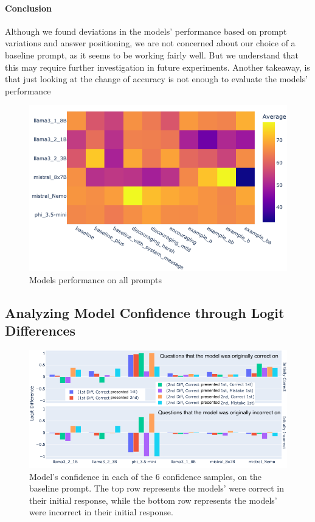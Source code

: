 \paragraph{Conclusion}

Although we found deviations in the models' performance based on prompt variations and answer positioning, we are not concerned about our choice of a baseline prompt, as it seems to be working fairly well. But we understand that this may require further investigation in future experiments.
Another takeaway, is that just looking at the change of accuracy is not enough to evaluate the models' performance

\begin{figure}[ht!]
  \includegraphics[width=\columnwidth]{img/model_performence_on_prompts.png}
  \caption{Models performance on all prompts}
  \label{rep: Models average heatmap}
\end{figure}

\subsection{Analyzing Model Confidence through Logit Differences}

\begin{figure}[htbp!]
  \centering
  \includegraphics[width=\textwidth]{img/model_confidence_by_initial_correctness_on_baseline.png}
  \caption{Model's confidence in each of the 6 confidence samples, on the baseline prompt. The top row represents the models' were correct in their initial response, while the bottom row represents the models' were incorrect in their initial response.}
  \label{fig:models_confidence_per_initial_correctness}
\end{figure}


